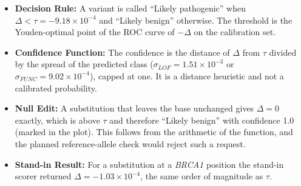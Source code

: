 \begin{itemize}
\item \textbf{Decision Rule:} A variant is called ``Likely pathogenic'' when $\Delta<\tau=-9.18\times10^{-4}$ and ``Likely benign'' otherwise. The threshold is the Youden-optimal point of the ROC curve of $-\Delta$ on the calibration set.
\item \textbf{Confidence Function:} The confidence is the distance of $\Delta$ from $\tau$ divided by the spread of the predicted class ($\sigma_{LOF}=1.51\times10^{-3}$ or $\sigma_{FUNC}=9.02\times10^{-4}$), capped at one. It is a distance heuristic and not a calibrated probability.
\item \textbf{Null Edit:} A substitution that leaves the base unchanged gives $\Delta=0$ exactly, which is above $\tau$ and therefore ``Likely benign'' with confidence 1.0 (marked in the plot). This follows from the arithmetic of the function, and the planned reference-allele check would reject such a request.
\item \textbf{Stand-in Result:} For a substitution at a \textit{BRCA1} position the stand-in scorer returned $\Delta=-1.03\times10^{-4}$, the same order of magnitude as $\tau$.
\end{itemize}

